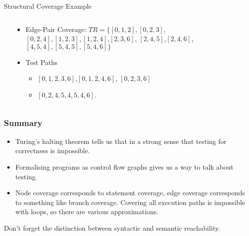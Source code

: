 \documentclass[handout]{beamer}
\begin{document}
\begin{frame}{Structural Coverage Example}
  \begin{columns}
    \begin{column}{0.2\textwidth}
    \end{column}
    \begin{column}{0.8\textwidth}
      \begin{itemize}
      \item Edge-Pair Coverage: $TR=\{[0,1,2],[0,2,3]$,
        $[0,2,4],[1,2,3],[1,2,4]$,$[2,3,6]$, $[2,4,5]$,$[2,4,6]$,
        $[4,5,4],[5,4,5],[5,4,6]\}$
      \item Test Paths
        \begin{itemize}
        \item $[0,1,2,3,6]$,$[0,1,2,4,6]$, $[0,2,3,6]$
        \item $[0,2,4,5,4,5,4,6]$.
        \end{itemize}
      \end{itemize}
    \end{column}
  \end{columns}
\end{frame}




\begin{frame}
  \frametitle{Summary}
  \begin{itemize}
  \item Turing's halting theorem tells us that in a strong sense that testing
    for correctness is impossible.
  \item Formalising programs as control flow graphs gives us a way to talk
    about testing.
  \item Node coverage corresponds to statement coverage, edge coverage
    corresponds to something like branch coverage. Covering all execution
    paths is impossible with loops, so there are various approximations.
  \end{itemize}
  Don't forget the distinction between syntactic and semantic reachability. 
\end{frame}
\end{document}
